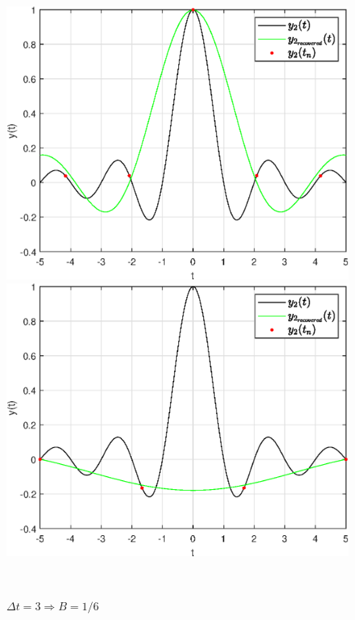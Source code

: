 \documentclass[a4paper]{article}
\begin{document}
\begin{figure}[H]
    \begin{minipage}{0.5\textwidth}
        \centering \includegraphics[width=\textwidth]{graphs2/T_50_dt_2_B_0.25_dv_0.02/func2_recovered.eps}
        \caption{$\Delta t = 2 \Rightarrow B = 0.25$}
    \end{minipage}\hfill
    \begin{minipage}{0.5\textwidth}
        \centering \includegraphics[width=\textwidth]{graphs2/T_50_dt_3_B_0.16667_dv_0.02/func2_recovered.eps}
        \caption{$\Delta t = 3 \Rightarrow B = 1/6$}
    \end{minipage}\\[1em]
\end{figure}\noindent\
\end{document}
